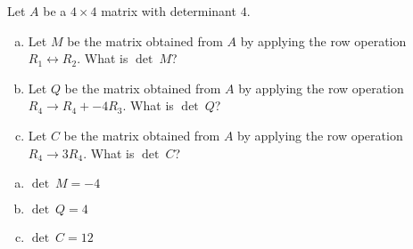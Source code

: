 
\begin{exerciseStatement}


Let \(A\) be a \(4 \times 4\) matrix with determinant \( 4 \).


\begin{enumerate}[(a)]
\item Let \(M\) be the matrix obtained from \(A\) by applying the row operation \( R_1 \leftrightarrow R_2 \). What is \(\operatorname{det}\ M\)?
\item Let \(Q\) be the matrix obtained from \(A\) by applying the row operation \( R_4 \to R_4 + -4R_3 \). What is \(\operatorname{det}\ Q\)?
\item Let \(C\) be the matrix obtained from \(A\) by applying the row operation \( R_4 \to 3R_4 \). What is \(\operatorname{det}\ C\)?
\end{enumerate}
    
\end{exerciseStatement}
    
\begin{exerciseAnswer} 

\begin{enumerate}[(a)]
\item \(\operatorname{det}\ M= -4 \)
\item \(\operatorname{det}\ Q= 4 \)
\item \(\operatorname{det}\ C= 12 \)
\end{enumerate}
    
\end{exerciseAnswer}
    
